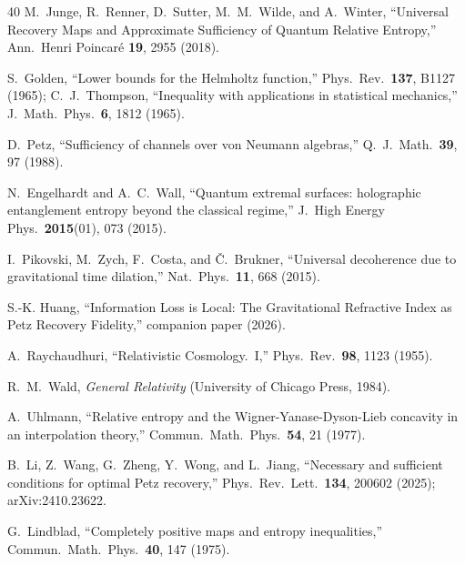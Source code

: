 \documentclass[aps,prd,preprint,superscriptaddress,longbibliography]{revtex4-2}
\begin{document}
\begin{thebibliography}{40}
M.~Junge, R.~Renner, D.~Sutter, M.~M.~Wilde, and A.~Winter,
``Universal Recovery Maps and Approximate Sufficiency of Quantum
Relative Entropy,''
Ann.\ Henri Poincar\'e \textbf{19}, 2955 (2018).

S.~Golden, ``Lower bounds for the Helmholtz function,''
Phys.\ Rev.\ \textbf{137}, B1127 (1965);
C.~J.~Thompson, ``Inequality with applications in statistical
mechanics,'' J.\ Math.\ Phys.\ \textbf{6}, 1812 (1965).

D.~Petz,
``Sufficiency of channels over von Neumann algebras,''
Q.\ J.\ Math.\ \textbf{39}, 97 (1988).

N.~Engelhardt and A.~C.~Wall,
``Quantum extremal surfaces: holographic entanglement entropy beyond
the classical regime,''
J.\ High Energy Phys.\ \textbf{2015}(01), 073 (2015).

I.~Pikovski, M.~Zych, F.~Costa, and \v{C}.~Brukner,
``Universal decoherence due to gravitational time dilation,''
Nat.\ Phys.\ \textbf{11}, 668 (2015).

S.-K. Huang,
``Information Loss is Local: The Gravitational Refractive Index as Petz
Recovery Fidelity,'' companion paper (2026).

A.~Raychaudhuri,
``Relativistic Cosmology.\ I,''
Phys.\ Rev.\ \textbf{98}, 1123 (1955).

R.~M.~Wald,
\emph{General Relativity} (University of Chicago Press, 1984).

A.~Uhlmann,
``Relative entropy and the Wigner-Yanase-Dyson-Lieb concavity in an interpolation theory,''
Commun.\ Math.\ Phys.\ \textbf{54}, 21 (1977).

B.~Li, Z.~Wang, G.~Zheng, Y.~Wong, and L.~Jiang,
``Necessary and sufficient conditions for optimal Petz recovery,''
Phys.\ Rev.\ Lett.\ \textbf{134}, 200602 (2025);
arXiv:2410.23622.

G.~Lindblad,
``Completely positive maps and entropy inequalities,''
Commun.\ Math.\ Phys.\ \textbf{40}, 147 (1975).

\end{thebibliography}
\end{document}
